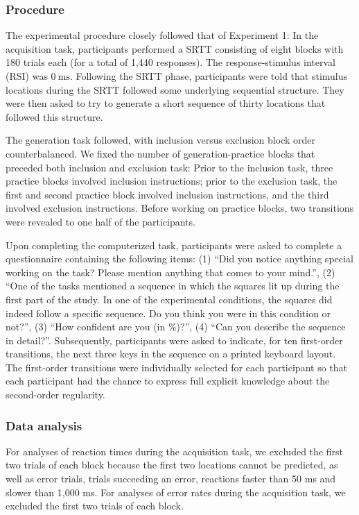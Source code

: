 \documentclass[floatsintext,doc]{apa6}
\theoremstyle{definition}
\theoremstyle{definition}
\theoremstyle{definition}
\theoremstyle{remark}
\begin{document}
\subsubsection{Procedure}\label{procedure-2}

The experimental procedure closely followed that of Experiment 1: In the
acquisition task, participants performed a SRTT consisting of eight
blocks with 180 trials each (for a total of 1,440 responses). The
response-stimulus interval (RSI) was \(0~\text{ms}\). Following the SRTT
phase, participants were told that stimulus locations during the SRTT
followed some underlying sequential structure. They were then asked to
try to generate a short sequence of thirty locations that followed this
structure.

The generation task followed, with inclusion versus exclusion block
order counterbalanced. We fixed the number of generation-practice blocks
that preceded both inclusion and exclusion task: Prior to the inclusion
task, three practice blocks involved inclusion instructions; prior to
the exclusion task, the first and second practice block involved
inclusion instructions, and the third involved exclusion instructions.
Before working on practice blocks, two transitions were revealed to one
half of the participants.

Upon completing the computerized task, participants were asked to
complete a questionnaire containing the following items: (1)
\enquote{Did you notice anything special working on the task? Please
mention anything that comes to your mind.}, (2) \enquote{One of the
tasks mentioned a sequence in which the squares lit up during the first
part of the study. In one of the experimental conditions, the squares
did indeed follow a specific sequence. Do you think you were in this
condition or not?}, (3) \enquote{How confident are you (in \%)?}, (4)
\enquote{Can you describe the sequence in detail?}. Subsequently,
participants were asked to indicate, for ten first-order transitions,
the next three keys in the sequence on a printed keyboard layout. The
first-order transitions were individually selected for each participant
so that each participant had the chance to express full explicit
knowledge about the second-order regularity.

\subsubsection{Data analysis}\label{data-analysis-2}

For analyses of reaction times during the acquisition task, we excluded
the first two trials of each block because the first two locations
cannot be predicted, as well as error trials, trials succeeding an
error, reactions faster than 50 ms and slower than 1,000 ms. For
analyses of error rates during the acquisition task, we excluded the
first two trials of each block.
\end{document}

